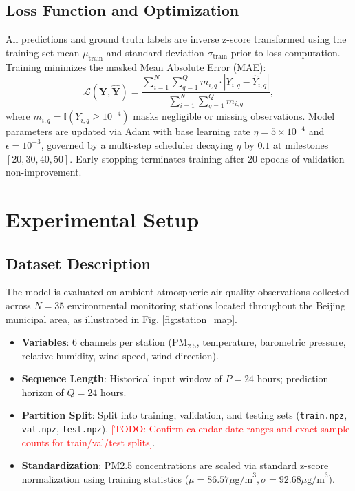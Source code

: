 \documentclass[conference]{IEEEtran}
\begin{document}
\subsection{Loss Function and Optimization}
All predictions and ground truth labels are inverse z-score transformed using the training set mean $\mu_{\text{train}}$ and standard deviation $\sigma_{\text{train}}$ prior to loss computation. Training minimizes the masked Mean Absolute Error (MAE):
\begin{equation}
\mathcal{L}(\boldsymbol{Y}, \widehat{\boldsymbol{Y}}) = \frac{\sum_{i=1}^N \sum_{q=1}^Q m_{i,q} \cdot |Y_{i,q} - \widehat{Y}_{i,q}|}{\sum_{i=1}^N \sum_{q=1}^Q m_{i,q}},
\label{eq:masked_mae}
\end{equation}
where $m_{i,q} = \mathbb{I}(Y_{i,q} \ge 10^{-4})$ masks negligible or missing observations. Model parameters are updated via Adam with base learning rate $\eta = 5 \times 10^{-4}$ and $\epsilon = 10^{-3}$, governed by a multi-step scheduler decaying $\eta$ by $0.1$ at milestones $[20, 30, 40, 50]$. Early stopping terminates training after 20 epochs of validation non-improvement.

\section{Experimental Setup}

\subsection{Dataset Description}
The model is evaluated on ambient atmospheric air quality observations collected across $N = 35$ environmental monitoring stations located throughout the Beijing municipal area, as illustrated in Fig. \ref{fig:station_map}.
\begin{itemize}
    \item \textbf{Variables}: 6 channels per station ($\text{PM}_{2.5}$, temperature, barometric pressure, relative humidity, wind speed, wind direction).
    \item \textbf{Sequence Length}: Historical input window of $P = 24$ hours; prediction horizon of $Q = 24$ hours.
    \item \textbf{Partition Split}: Split into training, validation, and testing sets (\texttt{train.npz}, \texttt{val.npz}, \texttt{test.npz}). \textcolor{red}{[TODO: Confirm calendar date ranges and exact sample counts for train/val/test splits]}.
    \item \textbf{Standardization}: PM2.5 concentrations are scaled via standard z-score normalization using training statistics ($\mu = 86.57 \mu\text{g/m}^3, \sigma = 92.68 \mu\text{g/m}^3$).
\end{itemize}
\end{document}
